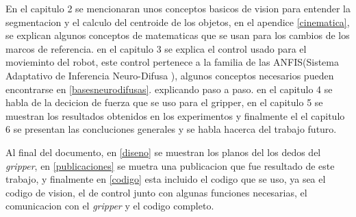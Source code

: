 En el capitulo 2 se mencionaran unos conceptos basicos de vision para entender la segmentacion y el calculo del centroide de los objetos, en el apendice \cref{cinematica}, se explican algunos conceptos de matematicas que se usan para los cambios de los marcos de referencia. en el capitulo 3 se explica el control usado para el movieminto del robot, este control pertenece a la familia de las ANFIS(Sistema Adaptativo de Inferencia Neuro-Difusa ), algunos conceptos necesarios pueden encontrarse en \cref{basesneurodifusas}. explicando paso a paso. en el capitulo 4 se habla de la decicion de fuerza que se uso para el gripper, 
en el capitulo 5 se muestran los resultados obtenidos en los experimentos y finalmente el el capitulo 6 se presentan las concluciones generales y se habla hacerca del trabajo futuro.

Al final del documento, en \cref{diseno} se muestran los planos del los dedos del \textit{gripper}, en \cref{publicaciones} se muetra una publicacion que fue resultado de este trabajo, y finalmente en \cref{codigo} esta incluido el codigo que se uso, ya sea el codigo de vision, el de control junto con algunas funciones necesarias, el comunicacion con el \textit{gripper} y el codigo completo.


